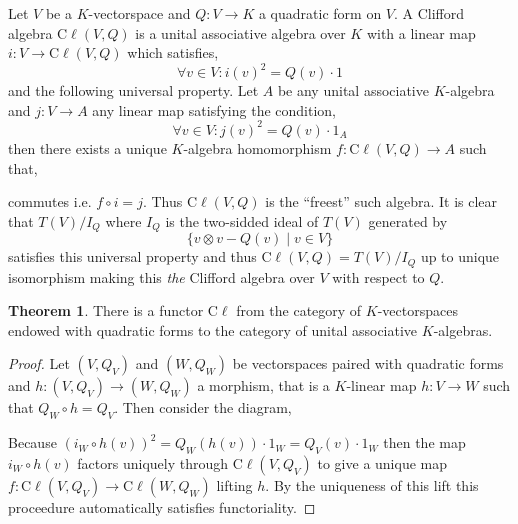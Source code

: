 \documentclass[12pt]{extarticle}
\theoremstyle{definition}
\newtheorem{theorem}{Theorem}[section]
\newenvironment{definition}[1][Definition:]{\begin{trivlist}
\item[\hskip \labelsep {\bfseries #1}]}{\end{trivlist}}
\newcommand{\Cl}{\mathrm{C} \ell}
\begin{document}
\begin{definition}
Let $V$ be a $K$-vectorspace and $Q : V \to K$ a quadratic form on $V$. A Clifford algebra $\Cl(V, Q)$ is a unital associative algebra over $K$ with a linear map $i : V \to \Cl(V, Q)$ which satisfies,
\[ \forall v \in V : i(v)^2 = Q(v) \cdot 1 \]
and the following universal property. Let $A$ be any unital associative $K$-algebra and $j : V \to A$ any linear map satisfying the condition,
\[ \forall v \in V : j(v)^2 = Q(v) \cdot 1_A \]
then there exists a unique $K$-algebra homomorphism $f : \Cl(V, Q) \to A$ such that,
\begin{center}
\end{center} 
commutes i.e. $f \circ i = j$. Thus $\Cl(V, Q)$ is the ``freest'' such algebra. It is clear that $T(V) / I_Q$ where $I_Q$ is the two-sidded ideal of $T(V)$ generated by 
\[ \{ v \otimes v - Q(v) \mid v \in V \} \]
satisfies this universal property and thus $\Cl(V, Q) = T(V) / I_Q$ up to unique isomorphism making this \textit{the} Clifford algebra over $V$ with respect to $Q$. 
\end{definition}

\begin{theorem}
There is a functor $\Cl$ from the category of $K$-vectorspaces endowed with quadratic forms to the category of unital associative $K$-algebras.
\end{theorem}

\begin{proof}
Let $(V, Q_V)$ and $(W, Q_W)$ be vectorspaces paired with quadratic forms and $h : (V, Q_V) \to (W, Q_W)$ a morphism, that is a $K$-linear map $h : V \to W$ such that $Q_W \circ h = Q_V$. Then consider the diagram,
\begin{center}
\end{center}
Because $(i_W \circ h(v))^2 = Q_W(h(v)) \cdot 1_W = Q_V(v) \cdot 1_W$ then the map $i_W \circ h(v)$ factors uniquely through $\Cl(V, Q_V)$ to give a unique map $f : \Cl(V, Q_V) \to \Cl(W, Q_W)$ lifting $h$. By the uniqueness of this lift this proceedure automatically satisfies functoriality. 
\end{proof}
\end{document}
